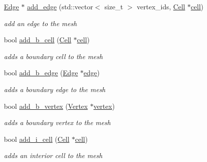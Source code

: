 \begin{DoxyCompactItemize}
\mbox{\label{classHArDCore2D_1_1Mesh_a7ed3868e665ca96c2b40641524c183a1}} 
\hyperlink{classHArDCore2D_1_1Edge}{Edge} $\ast$ \hyperlink{classHArDCore2D_1_1Mesh_a7ed3868e665ca96c2b40641524c183a1}{add\+\_\+edge} (std\+::vector$<$ size\+\_\+t $>$ vertex\+\_\+ids, \hyperlink{classHArDCore2D_1_1Cell}{Cell} $\ast$\hyperlink{classHArDCore2D_1_1Mesh_ae07b938c57cf57e3bb9c76d3df1eb549}{cell})
\begin{DoxyCompactList}\small\item\em add an edge to the mesh \end{DoxyCompactList}\item 
bool \hyperlink{group__Mesh_ga440c6f4a38af3d6c48d25fa416f24366}{add\+\_\+b\+\_\+cell} (\hyperlink{classHArDCore2D_1_1Cell}{Cell} $\ast$\hyperlink{classHArDCore2D_1_1Mesh_ae07b938c57cf57e3bb9c76d3df1eb549}{cell})
\begin{DoxyCompactList}\small\item\em adds a boundary cell to the mesh \end{DoxyCompactList}\item 
bool \hyperlink{group__Mesh_ga170b0f0bf5751a8e0cba0f5efccc66c4}{add\+\_\+b\+\_\+edge} (\hyperlink{classHArDCore2D_1_1Edge}{Edge} $\ast$\hyperlink{classHArDCore2D_1_1Mesh_acad7cdf3d2c00fa6fc23ff77c63c7d1a}{edge})
\begin{DoxyCompactList}\small\item\em adds a boundary edge to the mesh \end{DoxyCompactList}\item 
bool \hyperlink{group__Mesh_ga75f0405bae618848b2349ebb26eec675}{add\+\_\+b\+\_\+vertex} (\hyperlink{classHArDCore2D_1_1Vertex}{Vertex} $\ast$\hyperlink{classHArDCore2D_1_1Mesh_ad099224c697c05a57fad6a47fdcd9e76}{vertex})
\begin{DoxyCompactList}\small\item\em adds a boundary vertex to the mesh \end{DoxyCompactList}\item 
bool \hyperlink{group__Mesh_ga3a47d6ebfdb4254c57b7b672b51a992b}{add\+\_\+i\+\_\+cell} (\hyperlink{classHArDCore2D_1_1Cell}{Cell} $\ast$\hyperlink{classHArDCore2D_1_1Mesh_ae07b938c57cf57e3bb9c76d3df1eb549}{cell})
\begin{DoxyCompactList}\small\item\em adds an interior cell to the mesh \end{DoxyCompactList}\item 

\end{DoxyCompactItemize}
